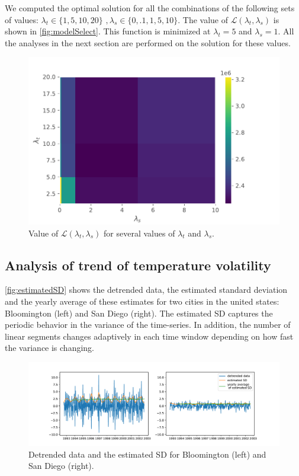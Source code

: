 \documentclass{article}
\begin{document}
We computed the optimal solution for all the combinations of the following sets of values: $\lambda_t \in \{1,5,10,20\} \, \, , \lambda_s \in \{0,.1,1,5,10\}$. The value of $\mathscr{L}(\lambda_t,\lambda_s)$ is shown in \autoref{fig:modelSelect}. This function is minimized at $\lambda_t=5$ and $\lambda_s=1$. All the analyses in the next section are performed on the solution for these values.

\begin{figure}[ht]
	\vskip 0.2in
	\begin{center}
		\centerline{\includegraphics[width=1\columnwidth]{Figures/modelSelect}}
		\caption{Value of $\mathscr{L}(\lambda_t,\lambda_s)$ for several values of $\lambda_t$ and $\lambda_s$. }
		\label{fig:modelSelect}
	\end{center}
	\vskip -0.2in
\end{figure}

\subsection{Analysis of trend of temperature volatility}
\autoref{fig:estimatedSD} shows the detrended data, the estimated standard deviation and the yearly average of these estimates for two cities in the united states: Bloomington (left) and San Diego (right). The estimated SD captures the periodic behavior in the variance of the time-series. In addition, the number of linear segments changes adaptively in each time window depending on how fast the variance is changing. 

\begin{figure}[ht]
	\vskip 0.2in
	\begin{center}
		\centerline{\includegraphics[width=1\columnwidth]{Figures/estimatedSD}}
		\caption{Detrended data and the estimated SD for Bloomington (left) and San Diego (right).}
		\label{fig:estimatedSD}
	\end{center}
	\vskip -0.2in
\end{figure}
\end{document}
